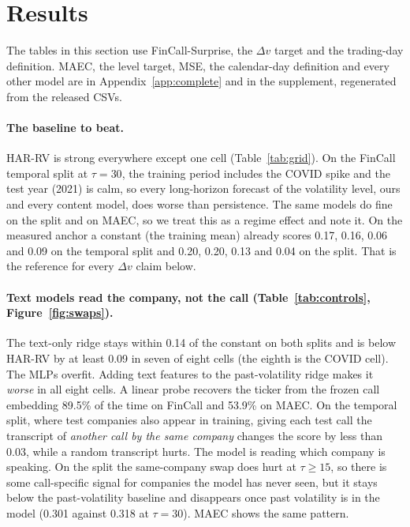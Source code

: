 \section{Results}
\label{sec:results}

The tables in this section use FinCall-Surprise, the $\Delta v$ target and the
trading-day definition. MAEC, the level target, MSE, the calendar-day definition
and every other model are in Appendix~\ref{app:complete} and in the supplement,
regenerated from the released CSVs.



\paragraph{The baseline to beat.}
HAR-RV is strong everywhere except one cell (Table~\ref{tab:grid}). On the FinCall
temporal split at $\tau{=}30$, the training period includes the COVID spike and
the test year (2021) is calm, so every long-horizon forecast of the volatility
level, ours and every content model, does worse than persistence. The same models
do fine on the \tickerdisjoint{} split and on MAEC, so we treat this as a regime
effect and note it. On the measured anchor a constant (the training mean) already
scores 0.17, 0.16, 0.06 and 0.09 on the temporal split and 0.20, 0.20, 0.13 and
0.04 on the \tickerdisjoint{} split. That is the reference for every $\Delta v$
claim below.

\paragraph{Text models read the company, not the call (Table~\ref{tab:controls}, Figure~\ref{fig:swaps}).}
The text-only ridge stays within 0.14 of the constant on both splits and is below
HAR-RV by at least 0.09 in seven of eight cells (the eighth is the COVID cell).
The MLPs overfit. Adding text features to the past-volatility ridge makes it
\emph{worse} in all eight cells. A linear probe recovers the ticker from the frozen
call embedding 89.5\% of the time on FinCall and 53.9\% on MAEC. On the temporal
split, where test companies also appear in training, giving each test call the
transcript of \emph{another call by the same company} changes the score by less
than 0.03, while a random transcript hurts. The
model is reading which company is speaking. On the \tickerdisjoint{} split the
same-company swap does hurt at $\tau\ge15$, so there is some call-specific signal
for companies the model has never seen, but it stays below the past-volatility
baseline and disappears once past volatility is in the model (0.301 against 0.318
at $\tau{=}30$). MAEC shows the same pattern.

